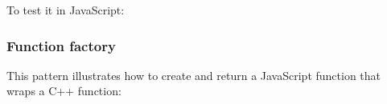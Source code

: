 To test it in JavaScript:

\begin{Shaded}
\begin{Highlighting}[]
 \NormalTok{(}\NormalTok{);}

 \NormalTok{(}\NormalTok{);}
 \NormalTok{(}\NormalTok{);}
\NormalTok{(}\NormalTok{+}\NormalTok{+}\NormalTok{); }
\end{Highlighting}
\end{Shaded}

\subsubsection{Function factory}\label{function-factory}

This pattern illustrates how to create and return a JavaScript function
that wraps a C++ function:

